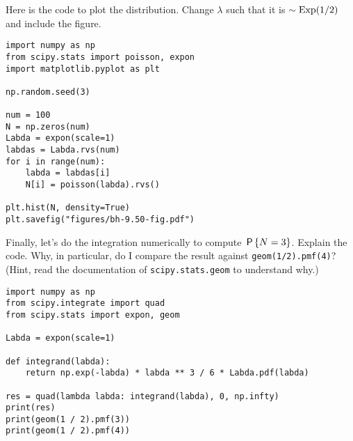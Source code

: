 \begin{exercise}
Here is the code to plot the distribution. Change $\lambda$ such that it is $\sim\Exp{1/2}$ and include the figure.
\begin{verbatim}
import numpy as np
from scipy.stats import poisson, expon
import matplotlib.pyplot as plt

np.random.seed(3)

num = 100
N = np.zeros(num)
Labda = expon(scale=1)
labdas = Labda.rvs(num)
for i in range(num):
    labda = labdas[i]
    N[i] = poisson(labda).rvs()

plt.hist(N, density=True)
plt.savefig("figures/bh-9.50-fig.pdf")
\end{verbatim}
\end{exercise}

\begin{exercise}
Finally, let's do the integration numerically to compute $\P{N=3}$. Explain the code. Why, in particular, do I compare the result against \texttt{geom(1/2).pmf(4)}? (Hint, read the documentation of \texttt{scipy.stats.geom}  to understand why.)
\begin{verbatim}
import numpy as np
from scipy.integrate import quad
from scipy.stats import expon, geom

Labda = expon(scale=1)

def integrand(labda):
    return np.exp(-labda) * labda ** 3 / 6 * Labda.pdf(labda)

res = quad(lambda labda: integrand(labda), 0, np.infty)
print(res)
print(geom(1 / 2).pmf(3))
print(geom(1 / 2).pmf(4))
\end{verbatim}

\end{exercise}



